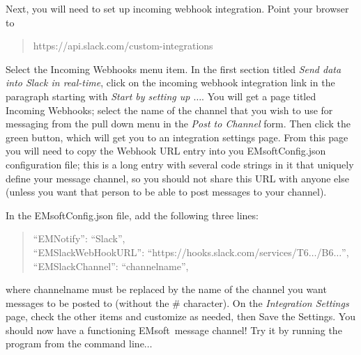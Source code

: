 \documentclass[DIV=calc, paper=letter, fontsize=11pt]{scrartcl}	 %
\newcommand{\ctp}{\textsf{EMsoft}}
\begin{document}
Next, you will need to set up \textsf{incoming webhook integration}. Point your browser to 
\begin{verse}
	\textsf{https://api.slack.com/custom-integrations}
\end{verse} 
Select the \textsf{Incoming Webhooks} menu item. In the first section titled \textit{Send data into Slack in real-time}, click on the \textsf{incoming webhook integration} link in the paragraph starting with \textit{Start by setting up $\ldots$}.  You will get a page titled \textsf{Incoming Webhooks}; select the name of the channel that you wish to use for messaging from the pull down menu in the \textit{Post to Channel} form.
Then click the green button, which will get you to an integration settings page.  From this page you will need to copy the \textsf{Webhook URL} entry into you \textsf{EMsoftConfig.json} configuration file; this is a long entry with several code strings in it that uniquely define your message channel, so you should not share this URL with anyone else (unless you want that person to be able to post messages to your channel).

In the \textsf{EMsoftConfig.json} file, add the following three lines:
\begin{verse}
	{\color{blue} ``EMNotify'': ``Slack'',\\
	``EMSlackWebHookURL'': ``https://hooks.slack.com/services/T6$\ldots$/B6$\ldots$'',\\
        ``EMSlackChannel'': ``channelname'',}
\end{verse}
where channelname must be replaced by the name of the channel you want messages to be posted to (without the \# character).  
On the \textit{Integration Settings} page, check the other items and customize as needed, then Save
the Settings.  You should now have a functioning \ctp\ message channel!  Try it by running the  program from the command line$\ldots$
\end{document}
